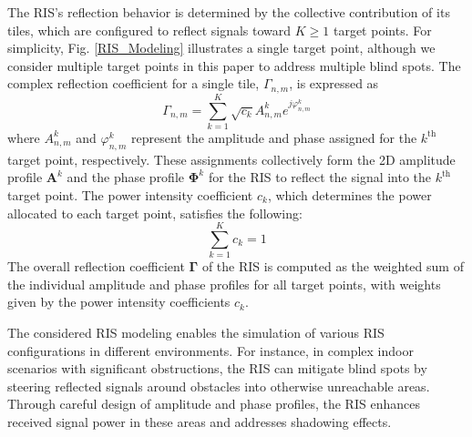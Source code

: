 \documentclass{IEEEoj}
\begin{document}
The RIS's reflection behavior is determined by the collective contribution of its tiles, which are configured to reflect signals toward $K \geq 1$ target points. For simplicity, Fig. \ref{RIS_Modeling} illustrates a single target point, although we consider multiple target points in this paper to address multiple blind spots. The complex reflection coefficient for a single tile, $\Gamma_{n,m}$, is expressed as
\begin{equation} \label{ref_coef_exp}
	\Gamma_{n,m} = \sum \limits_{k=1}^K \sqrt{c_k} A_{n,m}^k e^{j \varphi_{n,m}^k}
\end{equation}
where $A_{n,m}^k$ and $\varphi_{n,m}^k$ represent the amplitude and phase assigned for the $k^{\text{th}}$ target point, respectively. These assignments collectively form the 2D amplitude profile $\mathbf{A}^k$ and the phase profile $\mathbf{\Phi}^k$ for the RIS to reflect the signal into the $k^{\text{th}}$ target point. The power intensity coefficient $c_k$, which determines the power allocated to each target point, satisfies the following:
\begin{equation}
	\sum_{k=1}^K c_k = 1
\end{equation}
The overall reflection coefficient $\mathbf{\Gamma}$ of the RIS is computed as the weighted sum of the individual amplitude and phase profiles for all target points, with weights given by the power intensity coefficients $c_k$.

The considered RIS modeling enables the simulation of various RIS configurations in different environments. For instance, in complex indoor scenarios with significant obstructions, the RIS can mitigate blind spots by steering reflected signals around obstacles into otherwise unreachable areas. Through careful design of amplitude and phase profiles, the RIS enhances received signal power in these areas and addresses shadowing effects.
\end{document}
